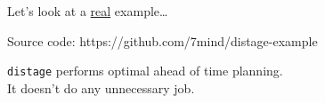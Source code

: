 \documentclass[usenames,dvipsnames,aspectratio=169]{beamer}
\newcommand{\code}[1]{\colorbox{lightgray}{\texttt{#1}}}
\newcommand{\distage}{\texttt{distage}\xspace}
\begin{document}
\begin{frame}
  \begin{figure}
  \Huge Let's look at a \underline{real} example\dots
  \end{figure}

  \begin{figure}
  Source code: https://github.com/7mind/distage-example
  \end{figure}
\end{frame}


\begin{frame}
  \begin{figure}
    \huge \distage performs optimal ahead of time planning.
    \\
    It doesn't  do any unnecessary job.
  \end{figure}
\end{frame}
\end{document}
